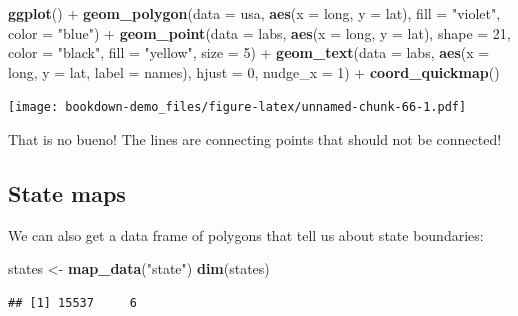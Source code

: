 \documentclass[]{book}
\newenvironment{Shaded}{\begin{snugshade}}{\end{snugshade}}
\newcommand{\KeywordTok}[1]{\textcolor[rgb]{0.13,0.29,0.53}{\textbf{{#1}}}}
\newcommand{\DataTypeTok}[1]{\textcolor[rgb]{0.13,0.29,0.53}{{#1}}}
\newcommand{\DecValTok}[1]{\textcolor[rgb]{0.00,0.00,0.81}{{#1}}}
\newcommand{\StringTok}[1]{\textcolor[rgb]{0.31,0.60,0.02}{{#1}}}
\newcommand{\NormalTok}[1]{{#1}}
\theoremstyle{definition}
\theoremstyle{definition}
\theoremstyle{remark}
\begin{document}
\begin{Shaded}
\begin{Highlighting}[]
\KeywordTok{ggplot}\NormalTok{() +}\StringTok{ }
\StringTok{      }\KeywordTok{geom_polygon}\NormalTok{(}\DataTypeTok{data =} \NormalTok{usa, }\KeywordTok{aes}\NormalTok{(}\DataTypeTok{x =} \NormalTok{long, }\DataTypeTok{y =} \NormalTok{lat), }\DataTypeTok{fill =} \StringTok{"violet"}\NormalTok{, }\DataTypeTok{color =} \StringTok{"blue"}\NormalTok{) +}\StringTok{ }
\StringTok{      }\KeywordTok{geom_point}\NormalTok{(}\DataTypeTok{data =} \NormalTok{labs, }\KeywordTok{aes}\NormalTok{(}\DataTypeTok{x =} \NormalTok{long, }\DataTypeTok{y =} \NormalTok{lat), }\DataTypeTok{shape =} \DecValTok{21}\NormalTok{, }\DataTypeTok{color =} \StringTok{"black"}\NormalTok{, }\DataTypeTok{fill =} \StringTok{"yellow"}\NormalTok{, }\DataTypeTok{size =} \DecValTok{5}\NormalTok{) +}
\StringTok{      }\KeywordTok{geom_text}\NormalTok{(}\DataTypeTok{data =} \NormalTok{labs, }\KeywordTok{aes}\NormalTok{(}\DataTypeTok{x =} \NormalTok{long, }\DataTypeTok{y =} \NormalTok{lat, }\DataTypeTok{label =} \NormalTok{names), }\DataTypeTok{hjust =} \DecValTok{0}\NormalTok{, }\DataTypeTok{nudge_x =} \DecValTok{1}\NormalTok{) +}
\StringTok{      }\KeywordTok{coord_quickmap}\NormalTok{()}
\end{Highlighting}
\end{Shaded}

\texttt{[image: bookdown-demo\_files/figure-latex/unnamed-chunk-66-1.pdf]}

That is no bueno! The lines are connecting points that should not be
connected!

\subsection{State maps}\label{state-maps}

We can also get a data frame of polygons that tell us about state
boundaries:

\begin{Shaded}
\begin{Highlighting}[]
\NormalTok{states <-}\StringTok{ }\KeywordTok{map_data}\NormalTok{(}\StringTok{"state"}\NormalTok{)}
\KeywordTok{dim}\NormalTok{(states)}
\end{Highlighting}
\end{Shaded}

\begin{verbatim}
## [1] 15537     6
\end{verbatim}
\end{document}
